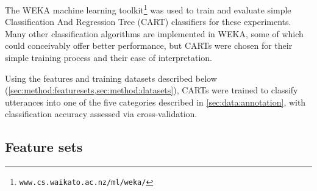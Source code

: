 \documentclass[a4paper]{article}
\newcommand{\TODO}[1]{{\color{red}\textbf{[TODO #1]}}}
\begin{document}
	
	 The WEKA machine learning toolkit\footnote{\texttt{www.cs.waikato.ac.nz/ml/weka/}} was used to train and evaluate simple Classification And Regression Tree (CART) classifiers for these experiments. 
	 Many other classification algorithms are implemented in WEKA, some of which could  conceivably offer better performance, but CARTs were chosen for their simple training process and their ease of interpretation. %


		Using the features and training datasets described below (\cref{sec:method:featuresets,sec:method:datasets}), CARTs were trained to classify utterances into one of the five categories described in \cref{sec:data:annotation},
		with classification accuracy assessed via cross-validation.
	
	
	    \subsection{Feature sets}
	    \label{sec:method:featuresets}
	    
	   
	    
\end{document}
